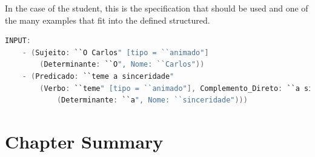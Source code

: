 
In the case of the student, this is the specification that should be used and one of the many examples that fit into the defined structured.

\begin{center}
\begin{minipage}{13cm}
\begin{lstlisting}[language=java, basicstyle=\tiny, label={lst:metaInput}, caption=Example of the students parsing]
INPUT:
    - (Sujeito: ``O Carlos" [tipo = ``animado"]
        (Determinante: ``O", Nome: ``Carlos"))
    - (Predicado: ``teme a sinceridade" 
        (Verbo: ``teme" [tipo = ``animado"], Complemento_Direto: ``a sinceridade" 
            (Determinante: ``a", Nome: ``sinceridade")))
\end{lstlisting}
\end{minipage}
\end{center}




\section{Chapter Summary}

